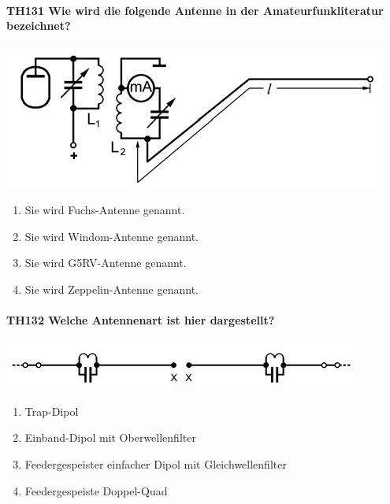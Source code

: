 \documentclass[8pt]{article}
\begin{document}
\paragraph*{TH131 Wie wird die folgende Antenne in der Amateurfunkliteratur bezeichnet?}
\begin{center}
	\begin{minipage}{\linewidth}
		\centering
		\includegraphics[scale=1.0]{pics/th131_a.jpg}
	\end{minipage}
\end{center}
\begin{enumerate}[nolistsep,label=\Alph*]
\item Sie wird Fuchs-Antenne genannt.
\item Sie wird Windom-Antenne genannt.
\item Sie wird G5RV-Antenne genannt.
\item Sie wird Zeppelin-Antenne genannt.
\end{enumerate}

\paragraph*{TH132 Welche Antennenart ist hier dargestellt?} 
\begin{center}
	\begin{minipage}{\linewidth}
		\centering
		\includegraphics[scale=1.0]{pics/th132_a.jpg}
	\end{minipage}
\end{center}
\begin{enumerate}[nolistsep,label=\Alph*]
\item Trap-Dipol
\item Einband-Dipol mit Oberwellenfilter
\item Feedergespeister einfacher Dipol mit Gleichwellenfilter
\item Feedergespeiste Doppel-Quad
\end{enumerate}
\end{document}

